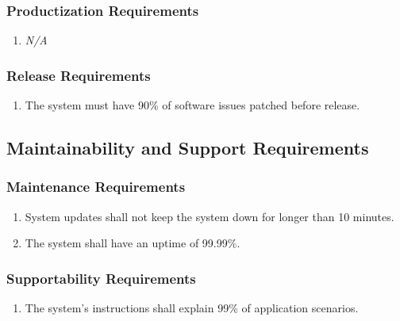 \documentclass{article}
\begin{document}
	\subsubsection{Productization Requirements}
	\label{ssub:productization_requirements}
	\begin{enumerate}[{OE}1. ]
		\item \emph{N/A}
	\end{enumerate}
	
	\subsubsection{Release Requirements}
	\label{ssub:release_requirements}
	\begin{enumerate}[{OE}1. ]
		\item The system must have 90\% of software issues patched before release.
	\end{enumerate}
	
	
	\subsection{Maintainability and Support Requirements}
	\label{sub:maintainability_and_support_requirements}
	
	\subsubsection{Maintenance Requirements}
	\label{ssub:maintenance_requirements}
	\begin{enumerate}[{MS}1. ]
		\item System updates shall not keep the system down for longer than 10 minutes.
		\item The system shall have an uptime of 99.99\%.
	\end{enumerate}
	
	\subsubsection{Supportability Requirements}
	\label{ssub:supportability_requirements}
	\begin{enumerate}[{MS}1. ]
		\item The system's instructions shall explain 99\% of application scenarios.
	\end{enumerate}
	
\end{document}
